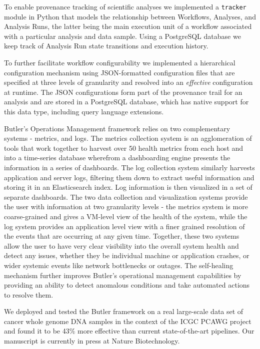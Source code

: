 To enable provenance tracking of scientific analyses we implemented a \texttt{tracker} module in Python that models the relationship between Workflows, Analyses, and Analysis Runs, the latter being the main execution unit of a workflow associated with a particular analysis and data sample. Using a PostgreSQL database we keep track of Analysis Run state transitions and execution history.

To further facilitate workflow configurability we implemented a hierarchical configuration mechanism using JSON-formatted configuration files that are specified at three levels of granularity and resolved into an \emph{effective} configuration at runtime. The JSON configurations form part of the provenance trail for an analysis and are stored in a PostgreSQL database, which has native support for this data type, including query language extensions\autocite{lerner2014forge}.

Butler's Operations Management framework relies on two complementary systems - metrics, and logs. The metrics collection system is an agglomeration of tools that work together to harvest over 50 health metrics from each host and into a time-series database wherefrom a dashboarding engine presents the information in a series of dashboards. The log collection system similarly harvests application and server logs, filtering them down to extract useful information and storing it in an Elasticsearch index. Log information is then visualized in a set of separate dashboards. The two data collection and visualization systems provide the user with information at two granularity levels - the metrics system is more coarse-grained and gives a VM-level view of the health of the system, while the log system provides an application level view with a finer grained resolution of the events that are occurring at any given time. Together, these two systems allow the user to have very clear visibility into the overall system health and detect any issues, whether they be individual machine or application crashes, or wider systemic events like network bottlenecks or outages. The self-healing mechanism further improves Butler's operational management capabilities by providing an ability to detect anomalous conditions and take automated actions to resolve them.

We deployed and tested the Butler framework on a real large-scale data set of cancer whole genome DNA samples in the context of the ICGC PCAWG project and found it to be 43\% more effective than current state-of-the-art pipelines. Our manuscript is currently in press at Nature Biotechnology\autocite{yakneen2017enabling}.